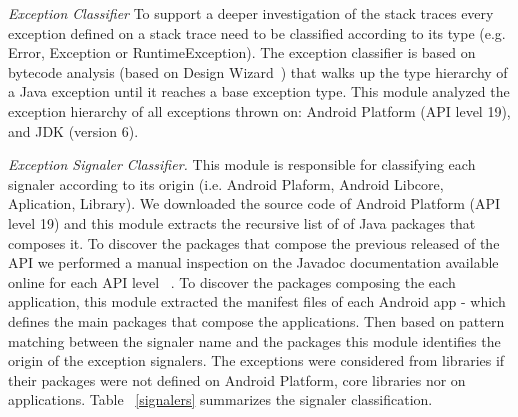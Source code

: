 \documentclass[conference]{IEEEtran}
\begin{document}


\noindent\emph{Exception Classifier} To support a deeper investigation of the stack traces 
every exception defined on a stack trace need to be classified according to its type
(e.g. Error, Exception or RuntimeException). The exception classifier is based on 
bytecode analysis (based on Design Wizard~\cite{Brunet09}) that walks up the 
type hierarchy of a Java exception until it reaches a base exception type.
This module analyzed the exception hierarchy of all exceptions thrown on:
  Android Platform (API level 19), and JDK (version 6).


\noindent\emph{Exception Signaler Classifier.} 
This module is responsible for classifying each signaler according 
to its origin (i.e. Android Plaform, Android Libcore, Aplication, Library). 
We downloaded the source code of Android Platform (API level 19)
and this module extracts the recursive list of 
of Java packages that composes it. To discover the packages that compose 
the previous released of the API we performed a manual inspection on the Javadoc
documentation available online for each API level ~\cite{apidocs}.
To discover the packages composing the each application, this module 
extracted the manifest files of each Android app
 - which defines the main packages that compose the applications.
Then based on pattern matching between the signaler name and the packages 
 this module identifies the origin of the exception signalers.
The exceptions were considered from libraries if their packages were not defined 
on Android Platform, core libraries nor on applications.
Table ~\ref{signalers} summarizes the signaler classification.
\end{document}
